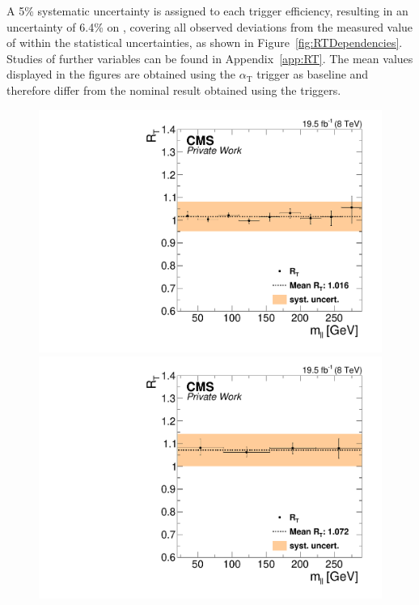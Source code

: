 A 5\% systematic uncertainty is assigned to each trigger efficiency, resulting in an uncertainty of 6.4\% on \RT, covering all observed deviations from the measured value of \RT within the statistical uncertainties, as shown in Figure~\ref{fig:RTDependencies}. Studies of further variables can be found in Appendix~\ref{app:RT}. The mean \RT values displayed in the figures are obtained using the $\alpha_{\mathrm{T}}$ trigger as baseline and therefore differ from the nominal result obtained using the \HT triggers. 
\begin{figure}[htbp]
\centering
\begin{minipage}[t]{0.49\textwidth}
  \includegraphics[width=\textwidth]{plots/BG/trigger/Triggereff_SFvsOF_Syst_AlphaT_HighHTExclusiveCentral_Full2012_Mll_None.pdf}
\end{minipage}
\begin{minipage}[t]{0.49\textwidth}
\includegraphics[width=\textwidth]{plots/BG/trigger/Triggereff_SFvsOF_Syst_AlphaT_HighHTExclusiveForward_Full2012_Mll_None.pdf}

\end{minipage}
\end{figure}
